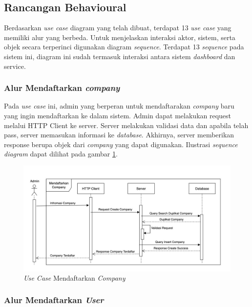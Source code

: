 \subsection{Rancangan Behavioural}
\label{subsec:arsitektur-behavioural}

Berdasarkan \textit{use case} diagram yang telah dibuat, terdapat 13 \textit{use case} yang memiliki alur yang berbeda. Untuk menjelaskan interaksi aktor, sistem, serta objek secara terperinci digunakan diagram \textit{sequence}. Terdapat 13 \textit{sequence} pada sistem ini, diagram ini sudah termasuk interaksi antara sistem \textit{dashboard} dan service.

\subsubsection{Alur Mendaftarkan \textit{company}}

Pada \textit{use case} ini, admin yang berperan untuk mendaftarakan \textit{company} baru yang ingin mendaftarkan ke dalam sistem. Admin dapat melakukan request melalui HTTP Client ke server. Server melakukan validasi data dan apabila telah pass, server memasukan informasi ke \textit{database}. Akhirnya, server memberikan response berupa objek dari \textit{company} yang dapat digunakan. Ilustrasi \textit{sequence diagram} dapat dilihat pada gambar \ref{fig:usecase-01}.

\begin{figure}
  \centering
  \includegraphics[width=1\textwidth]{resources/chapter-3/usecase/uc-01.jpg}
  \caption{\textit{Use Case} Mendaftarkan \textit{Company}}
  \label{fig:usecase-01}
\end{figure}

\pagebreak

\subsubsection{Alur Mendaftarkan \textit{User}}

